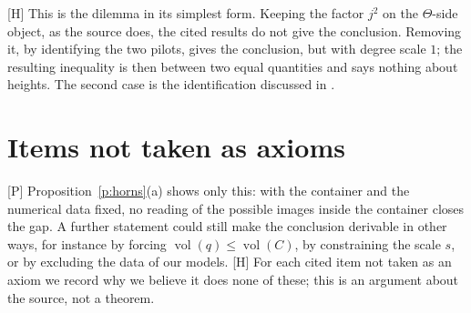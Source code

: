 \documentclass[11pt]{article}
\theoremstyle{plain}
\theoremstyle{definition}
\theoremstyle{remark}
\newcommand{\Pmark}{\textup{[P]}}
\newcommand{\Hmark}{\textup{[H]}}
\newcommand{\vol}{\operatorname{vol}}
\begin{document}
\Hmark{} This is the dilemma in its simplest form. Keeping the factor $j^2$ on the
$\Theta$-side object, as the source does, the cited results do not give the conclusion.
Removing it, by identifying the two pilots, gives the conclusion, but with degree scale
$1$; the resulting inequality is then between two equal quantities and says nothing
about heights. The second case is the identification discussed in \cite[\S2.2]{SS}.

\section{Items not taken as axioms}\label{s:omitted}

\Pmark{} Proposition~\ref{p:horns}(a) shows only this: with the container and the
numerical data fixed, no reading of the possible images inside the container closes the
gap. A further statement could still make the conclusion derivable in other ways, for
instance by forcing $\vol(q)\le\vol(C)$, by constraining the scale $s$, or by excluding the
data of our models. \Hmark{} For each cited item not taken as an axiom we record why we
believe it does none of these; this is an argument about the source, not a theorem.
\end{document}
